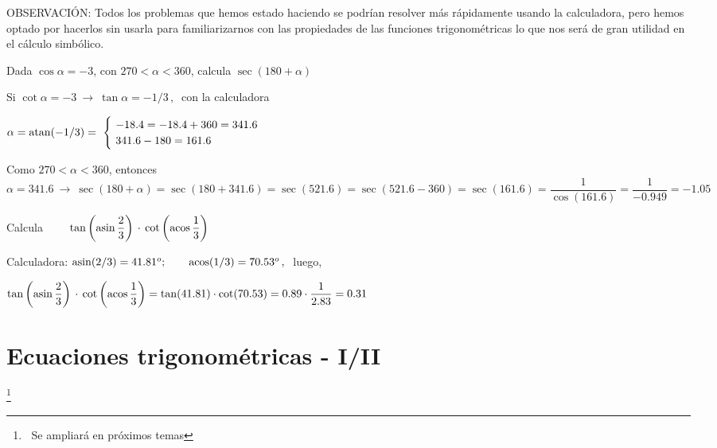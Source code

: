 \begin{cuadro-naranja}
	OBSERVACIÓN:  Todos los problemas que hemos estado haciendo se podrían resolver más rápidamente usando la calculadora, pero hemos optado por hacerlos sin usarla para familiarizarnos con las propiedades de las funciones trigonométricas lo que nos será de gran utilidad en el cálculo simbólico.
	
	\vspace{5mm}
	
	\begin{cuadro-gris}
	Dada $\cos \alpha=-3$, con $270<\alpha<360$, calcula $\sec(180+\alpha)$
	
	\vspace{5mm} Si $\cot \alpha = -3 \ \to \ \tan \alpha=-1/3\, , \ $ con la calculadora  
	
	$\alpha=\atan(-1/3)= \ \begin{cases} 
	\ -18.4=-18.4+360=341.6 \\ \ 341.6-180=161.6 \end{cases}$

Como  $270<\alpha<360$, entonces $\alpha=341. 6 \ \to \ \sec(180+\alpha)=\sec(180+341.6)=\sec(521.6)=\sec(521.6-360)=\sec(161.6)=\dfrac{1}{\cos(161.6)}=\dfrac{1}{-0.949}=-1.05$
	\end{cuadro-gris}
	
	\begin{cuadro-gris}
		Calcula $\qquad \tan \left( \asin \dfrac 2 3 \right) \, \cdot \, \cot \left( \acos \dfrac 1 3 \right)$
		
		\vspace{5mm}
		Calculadora: $\asin (2/3) = 41.81^o; \qquad \acos(1/3)=70.53^o\, , \ $ luego,
		
		$\tan \left( \asin \dfrac 2 3 \right) \, \cdot \, \cot \left( \acos \dfrac 1 3 \right)= \tan(41.81)\cdot \cot(70.53)= 0.89 \cdot \dfrac{1}{2.83}=0.31$
		
	\end{cuadro-gris}

\end{cuadro-naranja}



\vspace{1cm}
\section{Ecuaciones trigonométricas - I/II}
  \hspace{1cm} \footnote{$\ $ Se ampliará en próximos temas}
\vspace{0.5cm}



